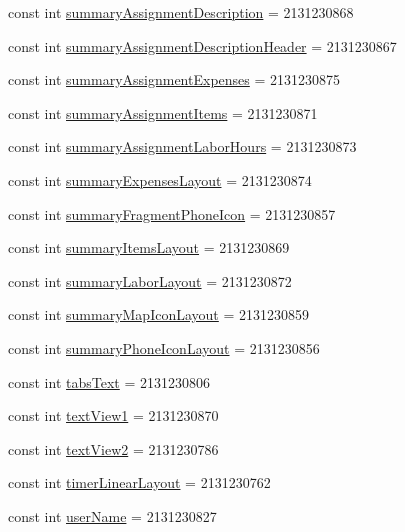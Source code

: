 \begin{DoxyCompactItemize}
const int \hyperlink{class_field_service_1_1_android_1_1_resource_1_1_id_a08695f637f8863dd70ed09b39aa3bc1a}{summary\+Assignment\+Description} = 2131230868
\item 
const int \hyperlink{class_field_service_1_1_android_1_1_resource_1_1_id_a2babd8445942e77dc149a6be3d9f01c1}{summary\+Assignment\+Description\+Header} = 2131230867
\item 
const int \hyperlink{class_field_service_1_1_android_1_1_resource_1_1_id_a2a0818bdd6f59610e4c972c616037164}{summary\+Assignment\+Expenses} = 2131230875
\item 
const int \hyperlink{class_field_service_1_1_android_1_1_resource_1_1_id_a5cf77a6038986c1fc84465e9738cc5d3}{summary\+Assignment\+Items} = 2131230871
\item 
const int \hyperlink{class_field_service_1_1_android_1_1_resource_1_1_id_ac824efea2a13a7d3485f55fe52d0261f}{summary\+Assignment\+Labor\+Hours} = 2131230873
\item 
const int \hyperlink{class_field_service_1_1_android_1_1_resource_1_1_id_ade5866e346eff381396484e6d2490fc7}{summary\+Expenses\+Layout} = 2131230874
\item 
const int \hyperlink{class_field_service_1_1_android_1_1_resource_1_1_id_a3cdfad7f95446652d6ae9e3d651a7ba2}{summary\+Fragment\+Phone\+Icon} = 2131230857
\item 
const int \hyperlink{class_field_service_1_1_android_1_1_resource_1_1_id_a4a180c32cb957705dc562993e1c3aa48}{summary\+Items\+Layout} = 2131230869
\item 
const int \hyperlink{class_field_service_1_1_android_1_1_resource_1_1_id_af5b0826023fc6c39d4b2397c82902ec3}{summary\+Labor\+Layout} = 2131230872
\item 
const int \hyperlink{class_field_service_1_1_android_1_1_resource_1_1_id_a40839ed85e99fd269d1cbd24c61222cd}{summary\+Map\+Icon\+Layout} = 2131230859
\item 
const int \hyperlink{class_field_service_1_1_android_1_1_resource_1_1_id_aa7c99e227d0dec41dda695aa9846dff0}{summary\+Phone\+Icon\+Layout} = 2131230856
\item 
const int \hyperlink{class_field_service_1_1_android_1_1_resource_1_1_id_ace359b54c3ca74addce3542c6e0afe4f}{tabs\+Text} = 2131230806
\item 
const int \hyperlink{class_field_service_1_1_android_1_1_resource_1_1_id_adb611f92c414851b9d38092452b055ac}{text\+View1} = 2131230870
\item 
const int \hyperlink{class_field_service_1_1_android_1_1_resource_1_1_id_a688389fd9bc2383cbe4b33c6769f402b}{text\+View2} = 2131230786
\item 
const int \hyperlink{class_field_service_1_1_android_1_1_resource_1_1_id_a05f1370d1abd23af64c2dd483a599dbf}{timer\+Linear\+Layout} = 2131230762
\item 
const int \hyperlink{class_field_service_1_1_android_1_1_resource_1_1_id_a05a8270baed5397986aadd34ac1c537c}{user\+Name} = 2131230827
\end{DoxyCompactItemize}


